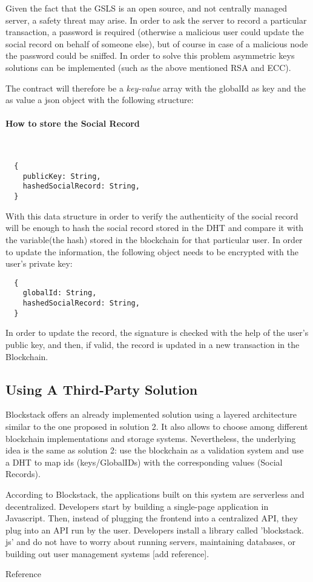 Given the fact that the GSLS is an open source, and not centrally managed server, a safety threat may arise.
In order to ask the server to record a particular transaction, a password is required (otherwise a malicious user could update the social record on behalf of someone else), but of course in case of a malicious node the password could be sniffed.
In order to solve this problem asymmetric keys solutions can be implemented (such as the above mentioned RSA and ECC).


The contract will therefore be a \textit{key-value} array with the globalId as key and the as value a json object with the following structure:

\paragraph{How to store the Social Record}\
\begin{lstlisting}
  {
	publicKey: String,
	hashedSocialRecord: String,
  }
\end{lstlisting}

With this data structure in order to verify the authenticity of the social record will be enough to hash the social record stored in the DHT and compare it with the variable(the hash) stored in the blockchain for that particular user.
In order to update the information, the following object needs to be encrypted with the user’s private key:

\begin{lstlisting}
  {
	globalId: String,
	hashedSocialRecord: String,
  }
\end{lstlisting}

In order to update the record, the signature is checked with the help of the user’s public key, and then, if valid, the record is updated in a new transaction in the Blockchain.

\subsection{Using A Third-Party Solution}
Blockstack offers an already implemented solution using a layered architecture similar to the one proposed in solution 2. It also allows to choose among different blockchain implementations and storage systems. Nevertheless, the underlying idea is the same as solution 2: use the blockchain as a validation system and use a DHT to map ids (keys/GlobalIDs) with the corresponding values (Social Records).

According to Blockstack, the applications built on this system are serverless and decentralized. Developers start by building a single-page application in Javascript. Then, instead of plugging the frontend into a centralized API, they plug into an API run by the user. Developers install a library called ’blockstack. js’ and do not have to worry about running servers, maintaining databases, or building out user management systems [add reference].
\begin{notation}
  Reference
\end{notation}

